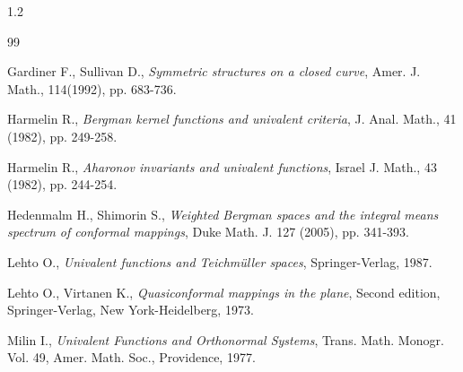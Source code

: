 \documentclass[10pt]{amsart}
\theoremstyle{definition}
\theoremstyle{remark}
\numberwithin{equation}{section}
\begin{document}
\begin{spacing}{1.2}
\begin{thebibliography}{99}

Gardiner F., Sullivan D., {\em Symmetric structures on a closed curve}, Amer. J. Math., 114(1992), pp. 683-736.



Harmelin R., {\em Bergman kernel functions and univalent criteria}, J. Anal. Math.,  41 (1982), pp. 249-258.

Harmelin R., {\em Aharonov invariants and univalent functions},  Israel J. Math., 43 (1982), pp.  244-254.



Hedenmalm H., Shimorin S., {\em Weighted Bergman spaces and the integral means spectrum of conformal mappings},  Duke Math. J. 127 (2005), pp. 341-393.



Lehto O., {\em Univalent functions and Teichm\"uller spaces}, Springer-Verlag, 1987.

Lehto O., Virtanen K., {\em Quasiconformal mappings in the plane}, Second edition, Springer-Verlag, New York-Heidelberg, 1973.


Milin I., {\em Univalent Functions and Orthonormal Systems}, Trans. Math. Monogr. Vol. 49, Amer. Math. Soc., Providence, 1977.


\end{thebibliography}
\end{spacing}
\end{document}

